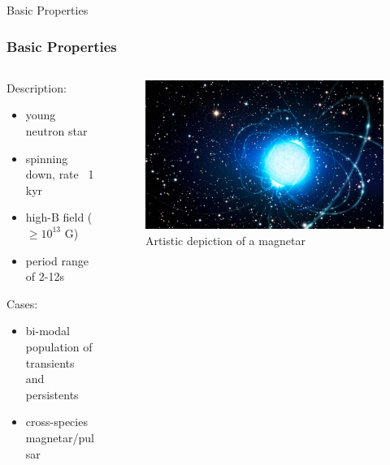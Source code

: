\documentclass[hyperref=pdftex, presentation]{beamer}
\begin{document}
\begin{frame}{\Large Basic Properties}
\frametitle{\Large Basic Properties}

\begin{minipage}[0.2\textheight]{\textwidth}
\begin{columns}[T]
\begin{column}{0.5\textwidth}

\begin{block}{Description:}

\begin{itemize}
 \item<2-> young neutron star%
 \item<3-> spinning down, rate ~1 kyr
 \item<4-> high-B field ($\ge 10^{13}$ G)
 \item<5-> period range of 2-12s %
\end{itemize}
\end{block}
\begin{block}{Cases:}

\begin{itemize}
 \item<6-> bi-modal population of transients and persistents%
 \item<7-> cross-species magnetar/pulsar
\end{itemize}
\end{block}
\end{column}
\begin{column}{0.5\textwidth}
	\begin{figure}
		\includegraphics[scale=.09]{figures/magnetar_art.jpg}
		\caption{Artistic depiction of a magnetar}
	\end{figure}
\end{column}
\end{columns}
\end{minipage}

\end{frame}
\end{document}
